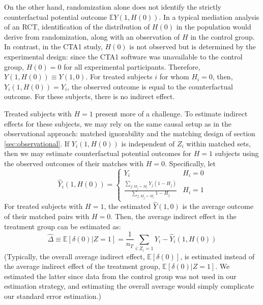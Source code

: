 \documentclass{article}\usepackage[]{graphicx}\usepackage[]{color}
\newcommand{\EE}{\mathbb{E}}
\begin{document}
On the other hand, randomization alone does not identify the strictly counterfactual
potential outcome $\EE Y(1,H(0))$.
In a typical mediation analysis of an RCT, identification of the
distribution of $H(0)$ in the population would derive from
randomization, along with an observation of $H$ in the control group.
In contrast, in the CTA1 study, $H(0)$ is not observed but is
determined by the experimental design: since the CTA1 software was
unavailable to the control group, $H(0)=0$ for all experimental
participants.
Therefore, $Y(1,H(0))\equiv Y(1,0)$.
For treated subjects $i$ for whom $H_i=0$, then, $Y_i(1,H(0))=Y_i$,
the observed outcome is equal to the counterfactual outcome.
For these subjects, there is no indirect effect.

Treated subjects with $H=1$ present more of a challenge.
To estimate indirect effects for these subjects, we may rely on the
same causal setup as in the observational approach:
matched ignorability and the matching design of section
\ref{sec:observational}.
If $Y_i(1,H(0))$ is independent of $Z_i$ within matched sets, then we
may estimate counterfactual potential outcomes for $H=1$ subjects
using the observed outcomes of their matches with $H=0$.
Specifically, let
\begin{equation*}
\hat{Y}_i(1,H(0))=\begin{cases}
 Y_i & H_i=0\\[3ex]
\frac{\displaystyle\sum_{j:M_j=M_i}
  Y_j(1-H_j)}{\displaystyle\sum_{j:M_j=M_i} 1-H_j} & H_i=1
\end{cases}
\end{equation*}
For treated subjects with $H=1$, the estimated $\hat{Y}(1,0)$ is the
average outcome of their matched pairs with $H=0$.
Then, the average indirect effect in the treatment group can be
estimated as:
\begin{equation*}
 \hat{\Delta}\equiv\widehat{\EE[\delta(0)|Z=1]}=\frac{1}{n_T}\displaystyle\sum_{i:Z_i=1} Y_i-\hat{Y}_i(1,H(0))
\end{equation*}
(Typically, the overall average indirect effect, $\EE[\delta(0)]$, is
estimated instead of the average indirect effect of the treatment
group, $\EE[\delta(0)|Z=1]$.
We estimated the latter since data from the control group was not used
in our estimation strategy, and estimating the overall average would
simply complicate our standard error estimation.)
\end{document}
